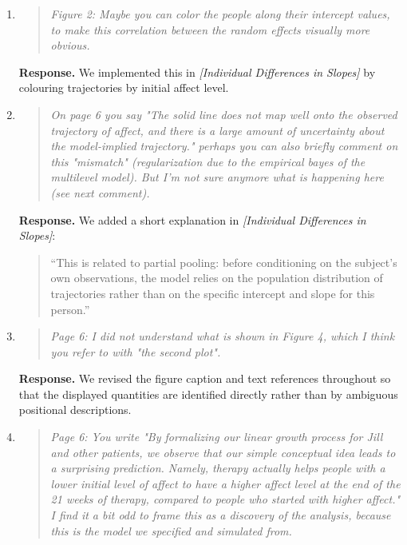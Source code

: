 \documentclass[11pt]{article}
\newcommand{\response}{\textbf{Response.} }
\newcommand{\secit}[1]{\textit{[#1]}}
\newcommand{\msq}[1]{\begin{quote}\small\noindent``#1''\end{quote}}
\newenvironment{reviewerpoint}{\begin{quote}\itshape}{\end{quote}}
\begin{document}
\begin{enumerate}[label=\textbf{Reviewer 1, Minor Point \arabic*.}]
\response We harmonised the measurement-error standard deviation to 0.2 throughout the manuscript.
\item

\begin{reviewerpoint}
Figure 2: Maybe you can color the people along their intercept values, to make this correlation between the random effects visually more obvious.
\end{reviewerpoint}

\response We implemented this in \secit{Individual Differences in Slopes} by colouring trajectories by initial affect level.
\item

\begin{reviewerpoint}
On page 6 you say "The solid line does not map well onto the observed trajectory of affect, and there is a large amount of uncertainty about the model-implied trajectory." perhaps you can also briefly comment on this "mismatch" (regularization due to the empirical bayes of the multilevel model).
But I'm not sure anymore what is happening here (see next comment).
\end{reviewerpoint}

\response We added a short explanation in \secit{Individual Differences in Slopes}:
\msq{This is related to partial pooling: before conditioning on the subject's own observations, the model relies on the population distribution of trajectories rather than on the specific intercept and slope for this person.}
\item

\begin{reviewerpoint}
Page 6: I did not understand what is shown in Figure 4, which I think you refer to with "the second plot".
\end{reviewerpoint}

\response We revised the figure caption and text references throughout so that the displayed quantities are identified directly rather than by ambiguous positional descriptions.
\item

\begin{reviewerpoint}
Page 6: You write "By formalizing our linear growth process for Jill and other patients, we observe that our simple conceptual idea leads to a surprising prediction.
Namely, therapy actually helps people with a lower initial level of affect to have a higher affect level at the end of the 21 weeks of therapy, compared to people who started with higher affect." I find it a bit odd to frame this as a discovery of the analysis, because this is the model we specified and simulated from.
\end{reviewerpoint}


\end{enumerate}
\end{document}
